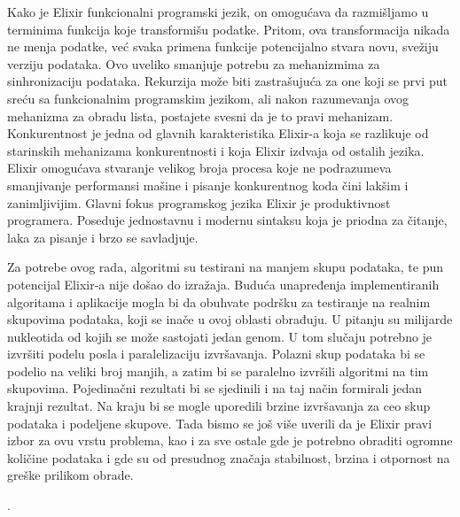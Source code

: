 \documentclass[12pt,oneside]{memoir}
\begin{document}
Kako je Elixir funkcionalni programski jezik, on omogućava da razmišljamo u terminima funkcija koje transformišu podatke. Pritom, ova transformacija nikada ne menja podatke, već svaka primena funkcije potencijalno stvara novu, svežiju verziju podataka. Ovo uveliko smanjuje potrebu za mehanizmima za sinhronizaciju podataka. Rekurzija može biti zastrašujuća za one koji se prvi put sreću sa funkcionalnim programskim jezikom, ali nakon razumevanja ovog mehanizma za obradu lista, postajete svesni da je to pravi mehanizam. Konkurentnost je jedna od glavnih karakteristika Elixir-a koja se razlikuje od starinskih mehanizama konkurentnosti i koja Elixir izdvaja od ostalih jezika. Elixir omogućava stvaranje velikog broja procesa koje ne podrazumeva smanjivanje performansi mašine i pisanje konkurentnog koda čini lakšim i zanimljivijim. Glavni fokus programskog jezika Elixir je produktivnost programera. Poseduje jednostavnu i modernu sintaksu koja je priodna za čitanje, laka za pisanje i brzo se savladjuje.

Za potrebe ovog rada, algoritmi su testirani na manjem skupu podataka, te pun potencijal Elixir-a nije došao do izražaja. 
Buduća unapređenja implementiranih algoritama i aplikacije mogla bi da obuhvate podršku za testiranje na realnim skupovima podataka, koji se inače u ovoj oblasti obrađuju. U pitanju su milijarde nukleotida od kojih se može sastojati jedan genom. U tom slučaju potrebno je izvršiti podelu posla i paralelizaciju izvršavanja. Polazni skup podataka bi se podelio na veliki broj manjih, a zatim bi se paralelno izvršili algoritmi na tim skupovima. Pojedinačni rezultati bi se sjedinili i na taj način formirali jedan krajnji rezultat. Na kraju bi se mogle uporedili brzine izvršavanja za ceo skup podataka i podeljene skupove. Tada bismo se još više uverili da je Elixir pravi izbor za ovu vrstu problema, kao i za sve ostale gde je potrebno obraditi ogromne količine podataka i gde su od presudnog značaja stabilnost, brzina i otpornost na greške prilikom obrade.
 



.%

\literatura

\backmatter
\end{document}
